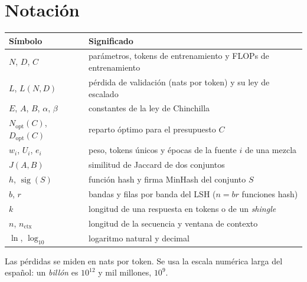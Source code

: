 \documentclass[11pt,a4paper,twoside,openany]{book}
\newcommand{\Nopt}{N_{\mathrm{opt}}}
\newcommand{\Dopt}{D_{\mathrm{opt}}}
\newcommand{\sig}{\operatorname{sig}}
\newcommand{\nctx}{n_{\mathrm{ctx}}}
\begin{document}
\section*{Notación}
\begin{center}
\begin{tabular}{@{}ll@{}}
\toprule
Símbolo & Significado \\
\midrule
$N$, $D$, $C$ & parámetros, tokens de entrenamiento y FLOPs de entrenamiento \\
$L$, $L(N,D)$ & pérdida de validación (nats por token) y su ley de escalado \\
$E$, $A$, $B$, $\alpha$, $\beta$ & constantes de la ley de Chinchilla \\
$\Nopt(C)$, $\Dopt(C)$ & reparto óptimo para el presupuesto $C$ \\
$w_i$, $U_i$, $e_i$ & peso, tokens únicos y épocas de la fuente $i$ de una mezcla \\
$J(A,B)$ & similitud de Jaccard de dos conjuntos \\
$h$, $\sig(S)$ & función hash y firma MinHash del conjunto $S$ \\
$b$, $r$ & bandas y filas por banda del LSH ($n=br$ funciones hash) \\
$k$ & longitud de una respuesta en tokens o de un \emph{shingle} \\
$n$, $\nctx$ & longitud de la secuencia y ventana de contexto \\
$\ln$, $\log_{10}$ & logaritmo natural y decimal \\
\bottomrule
\end{tabular}
\end{center}

Las pérdidas se miden en nats por token. Se usa la escala numérica larga del español: un \emph{billón} es $10^{12}$ y mil millones, $10^{9}$.


\tableofcontents

\mainmatter







\backmatter

\end{document}
